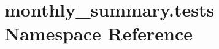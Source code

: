 \hypertarget{namespacemonthly__summary_1_1tests}{\section{monthly\-\_\-summary.\-tests Namespace Reference}
\label{namespacemonthly__summary_1_1tests}
}
